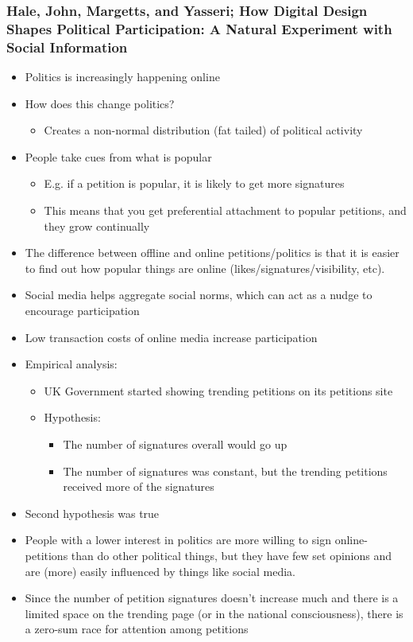 \documentclass[11pt]{article}
\begin{document}
\subsubsection{Hale, John, Margetts, and Yasseri; How Digital Design Shapes Political Participation: A Natural Experiment with Social Information}
\label{sec:org72e38d3}
\begin{itemize}
\item Politics is increasingly happening online
\item How does this change politics?
\begin{itemize}
\item Creates a non-normal distribution (fat tailed) of political activity
\end{itemize}
\item People take cues from what is popular
\begin{itemize}
\item E.g. if a petition is popular, it is likely to get more signatures
\item This means that you get preferential attachment to popular petitions, and
they grow continually
\end{itemize}
\item The difference between offline and online petitions/politics is that it is
easier to find out how popular things are online (likes/signatures/visibility,
etc).
\item Social media helps aggregate social norms, which can act as a nudge to
encourage participation
\item Low transaction costs of online media increase participation
\item Empirical analysis:
\begin{itemize}
\item UK Government started showing trending petitions on its petitions site
\item Hypothesis:
\begin{itemize}
\item The number of signatures overall would go up
\item The number of signatures was constant, but the trending petitions received
more of the signatures
\end{itemize}
\end{itemize}
\item Second hypothesis was true
\item People with a lower interest in politics are more willing to sign
online-petitions than do other political things, but they have few set
opinions and are (more) easily influenced by things like social media.
\item Since the number of petition signatures doesn't increase much and there is a
limited space on the trending page (or in the national consciousness), there is
a zero-sum race for attention among petitions
\end{itemize}
\end{document}
